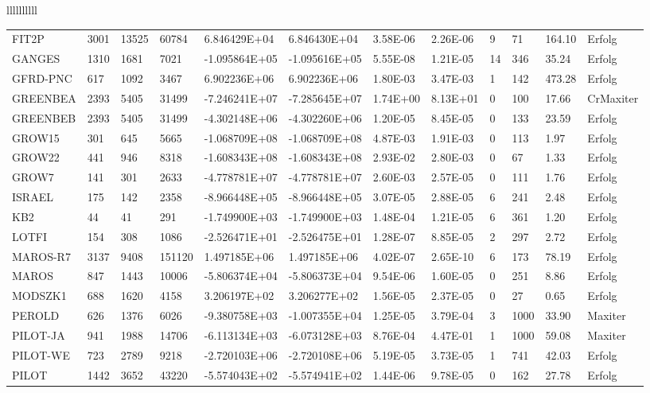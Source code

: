\begin{tabular}{llllllllll}
\begin{tabular}{llllllllllll}
FIT2P & 3001 & 13525 & 60784 & 6.846429E+04 & 6.846430E+04 & 3.58E-06 & 2.26E-06 & 9 & 71 & 164.10 & Erfolg \\
GANGES & 1310 & 1681 & 7021 & -1.095864E+05 & -1.095616E+05 & 5.55E-08 & 1.21E-05 & 14 & 346 & 35.24 & Erfolg \\
GFRD-PNC & 617 & 1092 & 3467 & 6.902236E+06 & 6.902236E+06 & 1.80E-03 & 3.47E-03 & 1 & 142 & 473.28 & Erfolg \\
GREENBEA & 2393 & 5405 & 31499 & -7.246241E+07 & -7.285645E+07 & 1.74E+00 & 8.13E+01 & 0 & 100 & 17.66 & CrMaxiter \\
GREENBEB & 2393 & 5405 & 31499 & -4.302148E+06 & -4.302260E+06 & 1.20E-05 & 8.45E-05 & 0 & 133 & 23.59 & Erfolg \\
GROW15 & 301 & 645 & 5665 & -1.068709E+08 & -1.068709E+08 & 4.87E-03 & 1.91E-03 & 0 & 113 & 1.97 & Erfolg \\
GROW22 & 441 & 946 & 8318 & -1.608343E+08 & -1.608343E+08 & 2.93E-02 & 2.80E-03 & 0 & 67 & 1.33 & Erfolg \\
GROW7 & 141 & 301 & 2633 & -4.778781E+07 & -4.778781E+07 & 2.60E-03 & 2.57E-05 & 0 & 111 & 1.76 & Erfolg \\
ISRAEL & 175 & 142 & 2358 & -8.966448E+05 & -8.966448E+05 & 3.07E-05 & 2.88E-05 & 6 & 241 & 2.48 & Erfolg \\
KB2 & 44 & 41 & 291 & -1.749900E+03 & -1.749900E+03 & 1.48E-04 & 1.21E-05 & 6 & 361 & 1.20 & Erfolg \\
LOTFI & 154 & 308 & 1086 & -2.526471E+01 & -2.526475E+01 & 1.28E-07 & 8.85E-05 & 2 & 297 & 2.72 & Erfolg \\
MAROS-R7 & 3137 & 9408 & 151120 & 1.497185E+06 & 1.497185E+06 & 4.02E-07 & 2.65E-10 & 6 & 173 & 78.19 & Erfolg \\
MAROS & 847 & 1443 & 10006 & -5.806374E+04 & -5.806373E+04 & 9.54E-06 & 1.60E-05 & 0 & 251 & 8.86 & Erfolg \\
MODSZK1 & 688 & 1620 & 4158 & 3.206197E+02 & 3.206277E+02 & 1.56E-05 & 2.37E-05 & 0 & 27 & 0.65 & Erfolg \\
PEROLD & 626 & 1376 & 6026 & -9.380758E+03 & -1.007355E+04 & 1.25E-05 & 3.79E-04 & 3 & 1000 & 33.90 & Maxiter \\
PILOT-JA & 941 & 1988 & 14706 & -6.113134E+03 & -6.073128E+03 & 8.76E-04 & 4.47E-01 & 1 & 1000 & 59.08 & Maxiter \\
PILOT-WE & 723 & 2789 & 9218 & -2.720103E+06 & -2.720108E+06 & 5.19E-05 & 3.73E-05 & 1 & 741 & 42.03 & Erfolg \\
PILOT & 1442 & 3652 & 43220 & -5.574043E+02 & -5.574941E+02 & 1.44E-06 & 9.78E-05 & 0 & 162 & 27.78 & Erfolg \\

\end{tabular}
\end{tabular}
